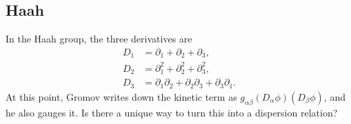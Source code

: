 \documentclass[12pt]{article}
\newcommand{\nn}{\nonumber\\}
\begin{document}
\subsection{Haah}

In the Haah group, the three derivatives are
\begin{align}
D_1 &= \partial_1 + \partial_2 + \partial_3,\nn
D_2 &= \partial_1^2 + \partial_2^2 + \partial_3^2,\nn
D_3 &= \partial_1 \partial_2 + \partial_2 \partial_3 + \partial_3 \partial_1.
\end{align}
At this point, Gromov writes down the kinetic term as $g_{\alpha\beta} (D_\alpha \phi) (D_\beta \phi)$, and he also gauges it. Is there a unique way to turn this into a dispersion relation?
\end{document}
